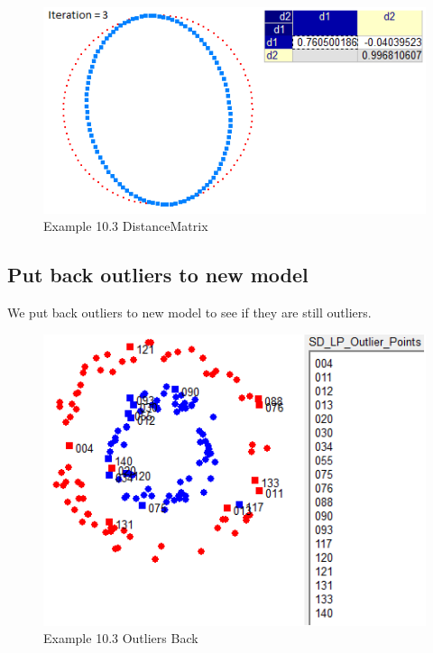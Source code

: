 \documentclass[]{article}
\begin{document}
\begin{figure}[htbp]
\begin{center}
\includegraphics[scale=0.7]{Example_10_3_DistanceMatrix_1.PNG}
\caption{Example 10.3 DistanceMatrix}
\label{fig:Example_10_3_DistanceMatrix_1}
\end{center}
\end{figure}


\newpage
\subsection{Put back outliers to new model}
We put back outliers to new model to see if they are still outliers.

\begin{figure}[htbp]
\begin{center}
\includegraphics[scale=0.7]{Example_10_3_OutliersBack_1.PNG}
\caption{Example 10.3 Outliers Back}
\label{fig:Example_10_3_OutliersBack_1}
\end{center}
\end{figure}
\end{document}
